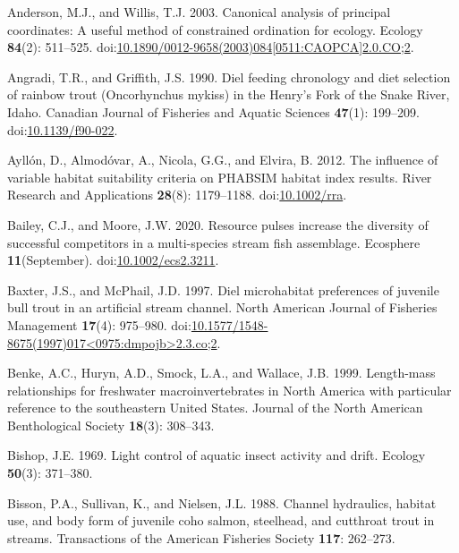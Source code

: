 \documentclass[]{article}
\begin{document}
\hypertarget{ref-Anderson2003}{}
Anderson, M.J., and Willis, T.J. 2003. Canonical analysis of principal
coordinates: A useful method of constrained ordination for ecology.
Ecology \textbf{84}(2): 511--525.
doi:\href{https://doi.org/10.1890/0012-9658(2003)084\%5B0511:CAOPCA\%5D2.0.CO;2}{10.1890/0012-9658(2003)084{[}0511:CAOPCA{]}2.0.CO;2}.

\hypertarget{ref-Angradi1990}{}
Angradi, T.R., and Griffith, J.S. 1990. Diel feeding chronology and diet
selection of rainbow trout (Oncorhynchus mykiss) in the Henry's Fork of
the Snake River, Idaho. Canadian Journal of Fisheries and Aquatic
Sciences \textbf{47}(1): 199--209.
doi:\href{https://doi.org/10.1139/f90-022}{10.1139/f90-022}.

\hypertarget{ref-Ayllon2012a}{}
Ayllón, D., Almodóvar, A., Nicola, G.G., and Elvira, B. 2012. The
influence of variable habitat suitability criteria on PHABSIM habitat
index results. River Research and Applications \textbf{28}(8):
1179--1188. doi:\href{https://doi.org/10.1002/rra}{10.1002/rra}.

\hypertarget{ref-Bailey2020}{}
Bailey, C.J., and Moore, J.W. 2020. Resource pulses increase the
diversity of successful competitors in a multi-species stream fish
assemblage. Ecosphere \textbf{11}(September).
doi:\href{https://doi.org/10.1002/ecs2.3211}{10.1002/ecs2.3211}.

\hypertarget{ref-Baxter1997a}{}
Baxter, J.S., and McPhail, J.D. 1997. Diel microhabitat preferences of
juvenile bull trout in an artificial stream channel. North American
Journal of Fisheries Management \textbf{17}(4): 975--980.
doi:\href{https://doi.org/10.1577/1548-8675(1997)017\%3C0975:dmpojb\%3E2.3.co;2}{10.1577/1548-8675(1997)017\textless{}0975:dmpojb\textgreater{}2.3.co;2}.

\hypertarget{ref-Benke1999}{}
Benke, A.C., Huryn, A.D., Smock, L.A., and Wallace, J.B. 1999.
Length-mass relationships for freshwater macroinvertebrates in North
America with particular reference to the southeastern United States.
Journal of the North American Benthological Society \textbf{18}(3):
308--343.

\hypertarget{ref-Bishop1969a}{}
Bishop, J.E. 1969. Light control of aquatic insect activity and drift.
Ecology \textbf{50}(3): 371--380.

\hypertarget{ref-Bisson1988}{}
Bisson, P.A., Sullivan, K., and Nielsen, J.L. 1988. Channel hydraulics,
habitat use, and body form of juvenile coho salmon, steelhead, and
cutthroat trout in streams. Transactions of the American Fisheries
Society \textbf{117}: 262--273.
\end{document}
